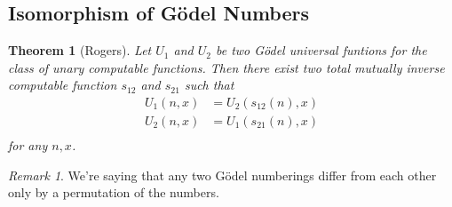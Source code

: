 \documentclass[10pt, letterpaper]{article}
\newtheorem{thm}{Theorem}
\theoremstyle{remark}
\newtheorem{rem}{Remark}
\theoremstyle{definition}
\begin{document}
\subsection*{Isomorphism of G\"{o}del Numbers}

\begin{thm}[Rogers]
    Let $U_1$ and $U_2$ be two G\"{o}del universal funtions for the class of unary computable functions. Then there exist two
    total mutually inverse computable function $s_{12}$ and $s_{21}$ such that 
    \begin{align*}
        U_1(n,x) &= U_2(s_{12}(n),x) \\
        U_2(n,x) &= U_1(s_{21}(n),x) \\
    \end{align*}
    for any $n,x$.
\end{thm}

\begin{rem}
    We're saying that any two G\"{o}del numberings differ from each other only by a permutation of the numbers.
\end{rem}
\end{document}
